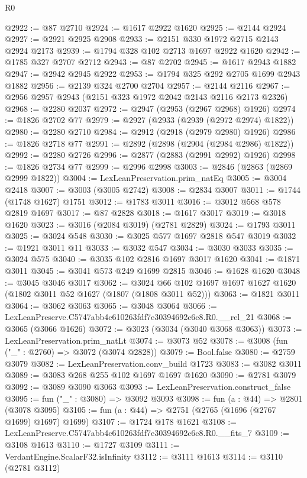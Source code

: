 \begin{lexlean}{R0}
\begin{coremodule}
@2922 := @87 @2710
@2924 := @1617 @2922 @1620
@2925 := @2144 @2924
@2927 := @2921 @2925 @2908
@2933 := @2151 @330 @1972 @2715 @2143 @2924 @2173
@2939 := @1794 @328 @102 @2713 @1697 @2922 @1620
@2942 := @1785 @327 @2707 @2712
@2943 := @87 @2702
@2945 := @1617 @2943 @1882
@2947 := @2942 @2945 @2922
@2953 := @1794 @325 @292 @2705 @1699 @2943 @1882
@2956 := @2139 @324 @2700 @2704
@2957 := @2144 @2116
@2967 := @2956 @2957 @2943 (@2151 @323 @1972 @2042 @2143 @2116 @2173 @2326)
@2968 := @2280 @2037
@2972 := @2947 (@2953 (@2967 @2968) @1926)
@2974 := @1826 @2702 @77
@2979 := @2927 (@2933 (@2939 (@2972 @2974) @1822))
@2980 := @2280 @2710
@2984 := @2912 (@2918 (@2979 @2980) @1926)
@2986 := @1826 @2718 @77
@2991 := @2892 (@2898 (@2904 (@2984 @2986) @1822))
@2992 := @2280 @2726
@2996 := @2877 (@2883 (@2991 @2992) @1926)
@2998 := @1826 @2734 @77
@2999 := @2996 @2998
@3003 := @2846 (@2863 (@2869 @2999 @1822))
@3004 := LexLeanPreservation.prim_natEq
@3005 := @3004 @2418
@3007 := @3003 (@3005 @2742)
@3008 := @2834 @3007
@3011 := @1744 (@1748 @1627) @1751
@3012 := @1783 @3011
@3016 := @3012 @568 @578 @2819 @1697
@3017 := @87 @2828
@3018 := @1617 @3017
@3019 := @3018 @1620
@3023 := @3016 (@2084 @3019) (@2781 @2829)
@3024 := @1793 @3011
@3025 := @3024 @548
@3030 := @3025 @577 @1697 @2818 @547 @3019
@3032 := @1921 @3011 @11
@3033 := @3032 @547
@3034 := @3030 @3033
@3035 := @3024 @575
@3040 := @3035 @102 @2816 @1697 @3017 @1620
@3041 := @1871 @3011
@3045 := @3041 @573 @249 @1699 @2815
@3046 := @1628 @1620
@3048 := @3045 @3046 @3017
@3062 := @3024 @66 @102 @1697 @1697 @1627 @1620 (@1802 @3011 @52 @1627 (@1807 (@1808 @3011 @52)))
@3063 := @1821 @3011
@3064 := @3062 @3063
@3065 := @3048 @3064
@3066 := LexLeanPreserve.C5747abb4c610263fdf7e30394692c6c8.R0.__rel_21
@3068 := @3065 (@3066 @1626)
@3072 := @3023 (@3034 (@3040 @3068 @3063))
@3073 := LexLeanPreservation.prim_natLt
@3074 := @3073 @52
@3078 := @3008 (fun ("_" : @2760) => @3072 (@3074 @2828))
@3079 := Bool.false
@3080 := @2759 @3079
@3082 := LexLeanPreservation.conv_build @1723
@3083 := @3082 @3011
@3089 := @3083 @268 @255 @102 @1697 @1697 @1620
@3090 := @2781 @3079
@3092 := @3089 @3090 @3063
@3093 := LexLeanPreservation.construct_false
@3095 := fun ("_" : @3080) => @3092 @3093
@3098 := fun (a : @44) => @2801 (@3078 @3095)
@3105 := fun (a : @44) => @2751 (@2765 (@1696 (@2767 @1699) @1697) @1699)
@3107 := @1724 @178 @1621
@3108 := LexLeanPreserve.C5747abb4c610263fdf7e30394692c6c8.R0.__fits_7
@3109 := @3108 @1613
@3110 := @1727 @3109
@3111 := VerdantEngine.ScalarF32.isInfinity
@3112 := @3111 @1613
@3114 := @3110 (@2781 @3112)

\end{coremodule}
\end{lexlean}
